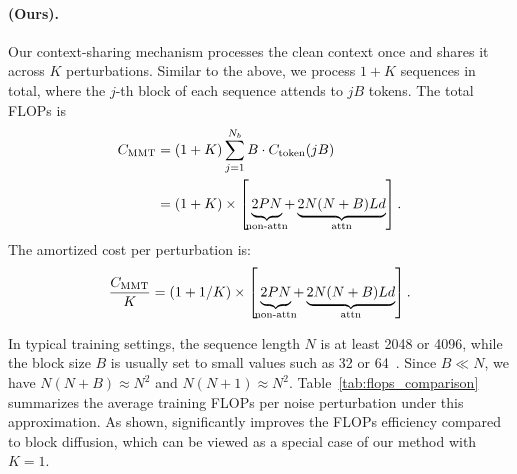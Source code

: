 \paragraph{\name{} (Ours).}
Our context-sharing mechanism processes the clean context once and shares it across $K$ perturbations.
Similar to the above, we process $1+K$ sequences in total, where the $j$-th block of each sequence attends to $jB$ tokens.
The total FLOPs is
\begin{equation}
\begin{aligned}
    C_{\text{\name{}}} &= (1+K) \sum_{j=1}^{N_b} B \cdot C_{\text{token}}(jB) \\
    &= (1+K) \times \left[\hspace{0.2em}\underbrace{2PN\vphantom{()}}_{\mathclap{\text{non-attn}}} + \underbrace{2N(N+B) L d}_{\mathclap{\text{attn}}}\right].
\end{aligned}
\end{equation}
The amortized cost per perturbation is:
\begin{equation}
    \frac{C_{\text{\name{}}}}{K} = (1+1/K) \times \left[\hspace{0.2em}\underbrace{2PN\vphantom{()}}_{\mathclap{\text{non-attn}}} + \underbrace{2N(N+B) L d}_{\mathclap{\text{attn}}}\right].
\end{equation}

In typical training settings, the sequence length $N$ is at least 2048 or 4096, while the block size $B$ is usually set to small values such as 32 or 64~\citep{fastdllmv2}.
Since $B \ll N$, we have $N(N+B) \approx N^2$ and $N(N+1) \approx N^2$.
Table~\ref{tab:flops_comparison} summarizes the average training FLOPs per noise perturbation under this approximation.
As shown, \name{} significantly improves the FLOPs efficiency compared to block diffusion, which can be viewed as a special case of our method with $K=1$.

\begin{table}[h]
\centering
\caption{Average FLOPs per sequence/perturbation. For \name{}, the cost is amortized over $K$ perturbations, and $(1+1/K) \approx 1$ when $K$ is reasonably large.}
\label{tab:flops_comparison}
\end{table}
